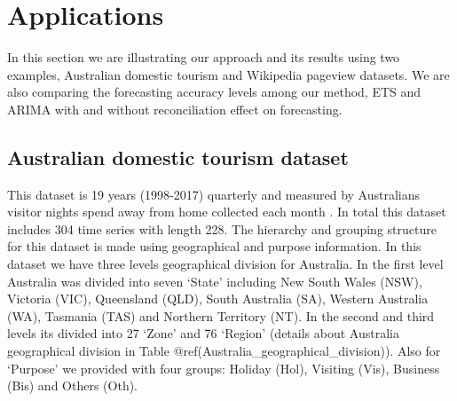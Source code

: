 \documentclass[11pt,a4paper,]{article}
\theoremstyle{definition}
\theoremstyle{definition}
\theoremstyle{definition}
\theoremstyle{remark}
\begin{document}
\section{Applications}\label{applications}

In this section we are illustrating our approach and its results using
two examples, Australian domestic tourism and Wikipedia pageview
datasets. We are also comparing the forecasting accuracy levels among
our method, ETS and ARIMA with and without reconciliation effect on
forecasting.

\subsection{Australian domestic tourism
dataset}\label{australian-domestic-tourism-dataset}

This dataset is 19 years (1998-2017) quarterly and measured by
Australians visitor nights spend away from home collected each month
\autocite{wickramasuriya2018optimal}. In total this dataset includes 304
time series with length 228. The hierarchy and grouping structure for
this dataset is made using geographical and purpose information. In this
dataset we have three levels geographical division for Australia. In the
first level Australia was divided into seven `State' including New South
Wales (NSW), Victoria (VIC), Queensland (QLD), South Australia (SA),
Western Australia (WA), Tasmania (TAS) and Northern Territory (NT). In
the second and third levels its divided into 27 `Zone' and 76 `Region'
(details about Australia geographical division in Table
@ref(Australia\_geographical\_division)). Also for `Purpose' we provided
with four groups: Holiday (Hol), Visiting (Vis), Business (Bis) and
Others (Oth).
\end{document}
